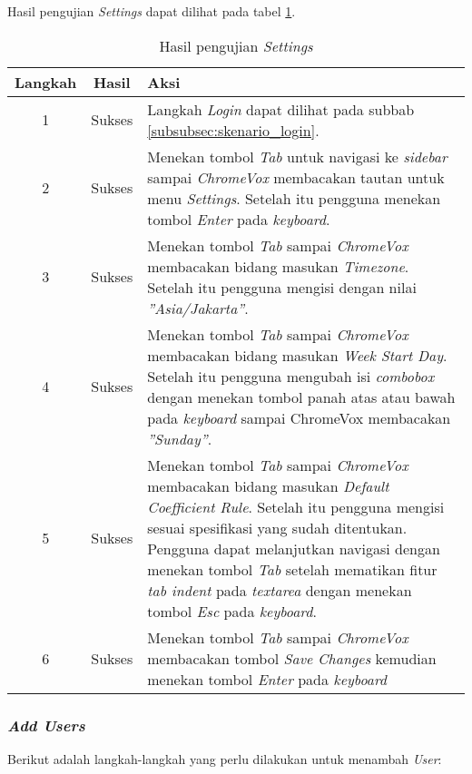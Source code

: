 Hasil pengujian \textit{Settings} dapat dilihat pada tabel \ref{tab:hasil_settings}.

\begin{table}[H]
	\centering
	\caption{Hasil pengujian \textit{Settings}}
	\label{tab:hasil_settings}
	\begin{tabular}{|c|c|p{12cm}|}
		\toprule
		Langkah & Hasil & Aksi\\
		\midrule
		1 & Sukses & Langkah \textit{Login} dapat dilihat pada subbab \ref{subsubsec:skenario_login}.\\
		2 & Sukses & Menekan tombol \textit{Tab} untuk navigasi ke \textit{sidebar} sampai \textit{ChromeVox} membacakan tautan untuk menu \textit{Settings}. Setelah itu pengguna menekan tombol \textit{Enter} pada \textit{keyboard}.\\
		3 & Sukses & Menekan tombol \textit{Tab} sampai \textit{ChromeVox} membacakan bidang masukan \textit{Timezone}. Setelah itu pengguna mengisi dengan nilai \textit{''Asia/Jakarta''}.\\
		4 & Sukses & Menekan tombol \textit{Tab} sampai \textit{ChromeVox} membacakan bidang masukan \textit{Week Start Day}. Setelah itu pengguna mengubah isi \textit{combobox} dengan menekan tombol panah atas atau bawah pada \textit{keyboard} sampai ChromeVox membacakan \textit{''Sunday''}.\\
		5 & Sukses & Menekan tombol \textit{Tab} sampai \textit{ChromeVox} membacakan bidang masukan \textit{Default Coefficient Rule}. Setelah itu pengguna mengisi sesuai spesifikasi yang sudah ditentukan. Pengguna dapat melanjutkan navigasi dengan menekan tombol \textit{Tab} setelah mematikan fitur \textit{tab indent} pada \textit{textarea} dengan menekan tombol \textit{Esc} pada \textit{keyboard}.\\
		6 & Sukses & Menekan tombol \textit{Tab} sampai \textit{ChromeVox} membacakan tombol \textit{Save Changes} kemudian menekan tombol \textit{Enter} pada \textit{keyboard}\\
		\bottomrule
	\end{tabular}
\end{table}

\subsubsection{\textit{Add Users}}
\label{subsubsec:skenario_add_users}
Berikut adalah langkah-langkah yang perlu dilakukan untuk menambah \textit{User}:

